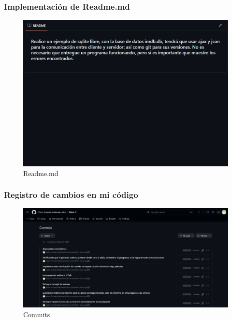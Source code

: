 \documentclass{article}
\begin{document}
  
  \subsubsection{Implementación de Readme.md}
  \begin{figure}[H]
    \centering
    \includegraphics[width=1\textwidth, keepaspectratio]{img/Readme.png}
    \caption{Readme.md}
  \end{figure}
  \newpage
  

	\subsubsection{Registro de cambios en mi código}
  \begin{figure}[H]
    \centering
    \includegraphics[width=1\textwidth, keepaspectratio]{img/commits.png}
    \caption{Commits}
  \end{figure}
	
\end{document}
